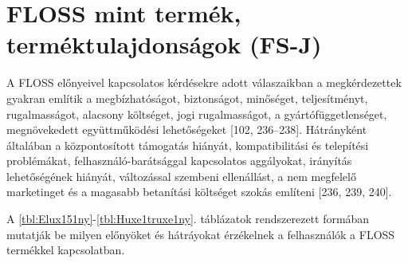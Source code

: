\documentclass[12pt,magyar,a4paper,oneside]{scrreprt}
\begin{document}
\hypertarget{floss-mint-termuxe9k-termuxe9ktulajdonsuxe1gok-fs-j}{%
\section{FLOSS mint termék, terméktulajdonságok
(FS-J)}\label{floss-mint-termuxe9k-termuxe9ktulajdonsuxe1gok-fs-j}}

A FLOSS előnyeivel kapcsolatos kérdésekre adott válaszaikban a
megkérdezettek gyakran említik a megbízhatóságot, biztonságot,
minőséget, teljesítményt, rugalmasságot, alacsony költséget, jogi
rugalmasságot, a gyártófüggetlenséget, megnövekedett együttműködési
lehetőségeket {[}102, 236--238{]}. Hátrányként általában a
központosított támogatás hiányát, kompatibilitási és telepítési
problémákat, felhasználó-barátsággal kapcsolatos aggályokat, irányítás
lehetőségének hiányát, változással szembeni ellenállást, a nem megfelelő
marketinget és a magasabb betanítási költséget szokás említeni {[}236,
239, 240{]}.

A \ref{tbl:Elux151ny}-\ref{tbl:Huxe1truxe1ny}. táblázatok rendszerezett
formában mutatják be milyen előnyöket és hátráyokat érzékelnek a
felhasználók a FLOSS termékkel kapcsolatban.
\end{document}
